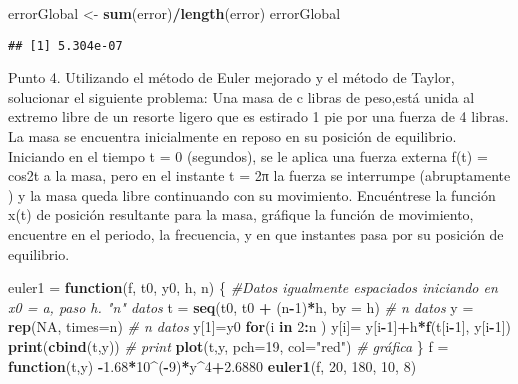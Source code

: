 \documentclass[]{article}
\newenvironment{Shaded}{\begin{snugshade}}{\end{snugshade}}
\newcommand{\KeywordTok}[1]{\textcolor[rgb]{0.13,0.29,0.53}{\textbf{#1}}}
\newcommand{\DataTypeTok}[1]{\textcolor[rgb]{0.13,0.29,0.53}{#1}}
\newcommand{\DecValTok}[1]{\textcolor[rgb]{0.00,0.00,0.81}{#1}}
\newcommand{\FloatTok}[1]{\textcolor[rgb]{0.00,0.00,0.81}{#1}}
\newcommand{\StringTok}[1]{\textcolor[rgb]{0.31,0.60,0.02}{#1}}
\newcommand{\CommentTok}[1]{\textcolor[rgb]{0.56,0.35,0.01}{\textit{#1}}}
\newcommand{\OtherTok}[1]{\textcolor[rgb]{0.56,0.35,0.01}{#1}}
\newcommand{\ControlFlowTok}[1]{\textcolor[rgb]{0.13,0.29,0.53}{\textbf{#1}}}
\newcommand{\OperatorTok}[1]{\textcolor[rgb]{0.81,0.36,0.00}{\textbf{#1}}}
\newcommand{\NormalTok}[1]{#1}
\begin{document}
\begin{Shaded}
\begin{Highlighting}[]
\NormalTok{errorGlobal <-}\StringTok{ }\KeywordTok{sum}\NormalTok{(error)}\OperatorTok{/}\KeywordTok{length}\NormalTok{(error)}
\NormalTok{errorGlobal}
\end{Highlighting}
\end{Shaded}

\begin{verbatim}
## [1] 5.304e-07
\end{verbatim}

Punto 4. Utilizando el método de Euler mejorado y el método de Taylor,
solucionar el siguiente problema: Una masa de c libras de peso,está
unida al extremo libre de un resorte ligero que es estirado 1 pie por
una fuerza de 4 libras. La masa se encuentra inicialmente en reposo en
su posición de equilibrio. Iniciando en el tiempo t = 0 (segundos), se
le aplica una fuerza externa f(t) = cos2t a la masa, pero en el instante
t = 2π la fuerza se interrumpe (abruptamente ) y la masa queda libre
continuando con su movimiento. Encuéntrese la función x(t) de posición
resultante para la masa, gráfique la función de movimiento, encuentre en
el periodo, la frecuencia, y en que instantes pasa por su posición de
equilibrio.

\begin{Shaded}
\begin{Highlighting}[]
\NormalTok{euler1 =}\StringTok{ }\ControlFlowTok{function}\NormalTok{(f, t0, y0, h, n) \{}
\CommentTok{#Datos igualmente espaciados iniciando en x0 = a, paso h. "n" datos }
\NormalTok{t =}\StringTok{ }\KeywordTok{seq}\NormalTok{(t0, t0 }\OperatorTok{+}\StringTok{ }\NormalTok{(n}\OperatorTok{-}\DecValTok{1}\NormalTok{)}\OperatorTok{*}\NormalTok{h, }\DataTypeTok{by =}\NormalTok{ h) }\CommentTok{# n datos}
\NormalTok{y =}\StringTok{ }\KeywordTok{rep}\NormalTok{(}\OtherTok{NA}\NormalTok{, }\DataTypeTok{times=}\NormalTok{n) }\CommentTok{# n datos}
\NormalTok{y[}\DecValTok{1}\NormalTok{]=y0}
\ControlFlowTok{for}\NormalTok{(i }\ControlFlowTok{in} \DecValTok{2}\OperatorTok{:}\NormalTok{n ) y[i]=}\StringTok{ }\NormalTok{y[i}\OperatorTok{-}\DecValTok{1}\NormalTok{]}\OperatorTok{+}\NormalTok{h}\OperatorTok{*}\KeywordTok{f}\NormalTok{(t[i}\OperatorTok{-}\DecValTok{1}\NormalTok{], y[i}\OperatorTok{-}\DecValTok{1}\NormalTok{])}
\KeywordTok{print}\NormalTok{(}\KeywordTok{cbind}\NormalTok{(t,y)) }\CommentTok{# print}
\KeywordTok{plot}\NormalTok{(t,y, }\DataTypeTok{pch=}\DecValTok{19}\NormalTok{, }\DataTypeTok{col=}\StringTok{"red"}\NormalTok{) }\CommentTok{# gráfica}
\NormalTok{\}}
\NormalTok{f =}\StringTok{ }\ControlFlowTok{function}\NormalTok{(t,y) }\OperatorTok{-}\FloatTok{1.68}\OperatorTok{*}\DecValTok{10}\OperatorTok{^}\NormalTok{(}\OperatorTok{-}\DecValTok{9}\NormalTok{)}\OperatorTok{*}\NormalTok{y}\OperatorTok{^}\DecValTok{4}\OperatorTok{+}\FloatTok{2.6880}
\KeywordTok{euler1}\NormalTok{(f, }\DecValTok{20}\NormalTok{, }\DecValTok{180}\NormalTok{, }\DecValTok{10}\NormalTok{, }\DecValTok{8}\NormalTok{)}
\end{Highlighting}
\end{Shaded}
\end{document}
